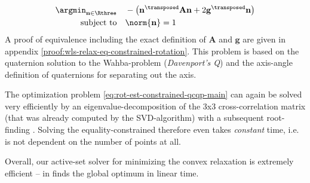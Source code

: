 \begin{equation}
	\label{eq:rot-est-constrained-qcqp-main}
	\begin{aligned}
		\argmin_{\mathbf{n} \in \Rthree} \quad &-\left(\mathbf{n}^\transposed \mathbf{A} \mathbf{n} + 2 \mathbf{g}^\transposed \mathbf{n} \right)\\
		\text{subject to} \quad &\norm{\mathbf{n}} = 1\\
	\end{aligned}
\end{equation}
A proof of equivalence including the exact definition of $\mathbf{A}$ and $\mathbf{g}$ are given in appendix \ref{proof:wls-relax-eq-constrained-rotation}. This problem is based on the quaternion solution to the Wahba-problem (\textit {Davenport's Q}) \cite{davenportsQ} \cite{8594296} and the axis-angle definition of quaternions for separating out the axis.

The optimization problem \ref{eq:rot-est-constrained-qcqp-main} can again be solved very efficiently by an eigenvalue-decomposition of the 3x3 cross-correlation matrix (that was already computed by the SVD-algorithm) with a subsequent root-finding \cite{10.1007/978-3-642-75536-1_57}. Solving the equality-constrained therefore even takes \textit{constant} time, i.e. is not dependent on the number of points at all.

Overall, our active-set solver for minimizing the convex relaxation is extremely efficient -- in finds the global optimum in linear time. 
